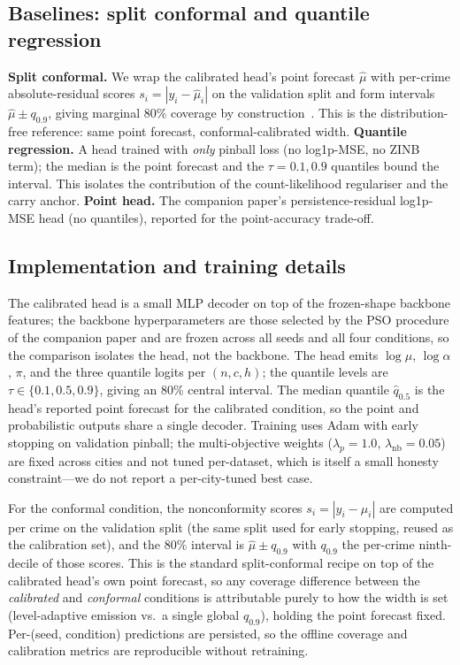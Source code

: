 \documentclass[11pt,conference]{IEEEtran}
\begin{document}
\subsection{Baselines: split conformal and quantile regression}\label{sec:baselines}
\textbf{Split conformal.} We wrap the calibrated head's point forecast
$\hat\mu$ with per-crime absolute-residual scores $s_i=|y_i-\hat\mu_i|$ on the
validation split and form intervals $\hat\mu\pm q_{0.9}$, giving marginal 80\%
coverage by construction~\cite{lei2018distribution}. This is the
distribution-free reference: same point forecast, conformal-calibrated width.
\textbf{Quantile regression.} A head trained with \emph{only} pinball loss (no
log1p-MSE, no ZINB term); the median is the point forecast and the
$\tau{=}0.1,0.9$ quantiles bound the interval. This isolates the contribution of
the count-likelihood regulariser and the carry anchor.
\textbf{Point head.} The companion paper's persistence-residual log1p-MSE head
(no quantiles), reported for the point-accuracy trade-off.

\subsection{Implementation and training details}\label{sec:impl}
The calibrated head is a small MLP decoder on top of the frozen-shape backbone
features; the backbone hyperparameters are those selected by the PSO procedure
of the companion paper and are frozen across all seeds and all four conditions,
so the comparison isolates the head, not the backbone. The head emits
$\log\mu$, $\log\alpha$, $\pi$, and the three quantile logits per $(n,c,h)$; the
quantile levels are $\tau\in\{0.1,0.5,0.9\}$, giving an 80\% central interval.
The median quantile $\hat q_{0.5}$ is the head's reported point forecast for the
calibrated condition, so the point and probabilistic outputs share a single
decoder. Training uses Adam with early stopping on validation pinball; the
multi-objective weights ($\lambda_p{=}1.0$, $\lambda_{\mathrm{nb}}{=}0.05$) are
fixed across cities and not tuned per-dataset, which is itself a small
honesty constraint---we do not report a per-city-tuned best case.

For the conformal condition, the nonconformity scores $s_i=|y_i-\hat\mu_i|$ are
computed per crime on the validation split (the same split used for early
stopping, reused as the calibration set), and the 80\% interval is
$\hat\mu\pm q_{0.9}$ with $q_{0.9}$ the per-crime ninth-decile of those scores.
This is the standard split-conformal recipe on top of the calibrated head's own
point forecast, so any coverage difference between the \emph{calibrated} and
\emph{conformal} conditions is attributable purely to how the width is set
(level-adaptive emission vs.\ a single global $q_{0.9}$), holding the point
forecast fixed. Per-(seed, condition) predictions are persisted, so the offline
coverage and calibration metrics are reproducible without retraining.
\end{document}
